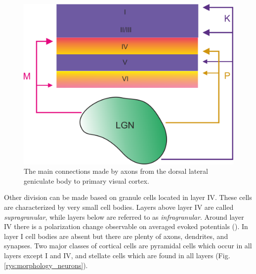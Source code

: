 \documentclass{pracalicmgr}
\begin{document}
   \begin{figure}[H]
   	\begin{center}
   		\includegraphics[scale=0.4]{aga_LGN.png}
   	\end{center}
   	\caption{The main connections made by axons from the dorsal lateral geniculate body to primary visual cortex.}
   	\label{rys:lgn}
   \end{figure}  
   \newpage
   Other division can be made based on granule cells located in layer IV. These cells are characterized by very small cell bodies. Layers above layer IV are called \emph{supragranular}, while layers below are referred to as \emph{infragranular}. Around layer IV there is a polarization change observable on averaged evoked potentials (\cite{maier2010}). In layer I cell bodies are absent but there are plenty of axons, dendrites, and synapses. Two major classes of cortical cells are pyramidal cells which occur in all layers except I and IV, and stellate cells which are found in all layers (Fig. \ref{rys:morphology_neurons}).
   
\end{document}
